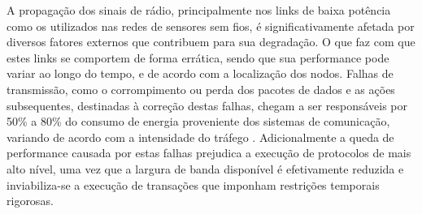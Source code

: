 \documentclass[
	12pt,				%
	openright,			%
	oneside,
	a4paper,			%
	english,			%
	french,				%
	spanish,			%
	brazil				%
	]{abntex2}
\begin{document}
A propagação dos sinais de rádio, principalmente nos links de baixa potência como os utilizados nas redes de sensores sem fios, é significativamente afetada por diversos fatores externos que contribuem para sua degradação. O que faz com que estes links se comportem de forma errática, sendo que sua performance pode variar ao longo do tempo, e de acordo com a localização dos nodos. Falhas de transmissão, como o corrompimento ou perda dos pacotes de dados e as ações subsequentes, destinadas à correção destas falhas, chegam a ser responsáveis por 50\% a 80\% do consumo de energia proveniente dos sistemas de comunicação, variando de acordo com a intensidade do tráfego \cite{Srinivasan2006}. Adicionalmente a queda de performance causada por estas falhas prejudica a execução de protocolos de mais alto nível, uma vez que a largura de banda disponível é efetivamente reduzida e inviabiliza-se a execução de transações que imponham restrições temporais rigorosas.
\end{document}
